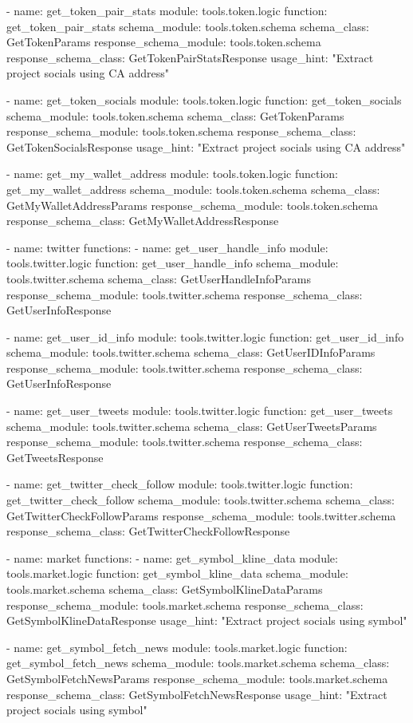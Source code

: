       - name: get_token_pair_stats
        module: tools.token.logic
        function: get_token_pair_stats
        schema_module: tools.token.schema
        schema_class: GetTokenParams
        response_schema_module: tools.token.schema
        response_schema_class: GetTokenPairStatsResponse
        usage_hint: "Extract project socials using CA address"

      - name: get_token_socials
        module: tools.token.logic
        function: get_token_socials
        schema_module: tools.token.schema
        schema_class: GetTokenParams
        response_schema_module: tools.token.schema
        response_schema_class: GetTokenSocialsResponse
        usage_hint: "Extract project socials using CA address"

      - name: get_my_wallet_address
        module: tools.token.logic
        function: get_my_wallet_address
        schema_module: tools.token.schema
        schema_class: GetMyWalletAddressParams
        response_schema_module: tools.token.schema
        response_schema_class: GetMyWalletAddressResponse

  - name: twitter
    functions:
      - name: get_user_handle_info
        module: tools.twitter.logic
        function: get_user_handle_info
        schema_module: tools.twitter.schema
        schema_class: GetUserHandleInfoParams
        response_schema_module: tools.twitter.schema
        response_schema_class: GetUserInfoResponse

      - name: get_user_id_info
        module: tools.twitter.logic
        function: get_user_id_info
        schema_module: tools.twitter.schema
        schema_class: GetUserIDInfoParams
        response_schema_module: tools.twitter.schema
        response_schema_class: GetUserInfoResponse

      - name: get_user_tweets
        module: tools.twitter.logic
        function: get_user_tweets
        schema_module: tools.twitter.schema
        schema_class: GetUserTweetsParams
        response_schema_module: tools.twitter.schema
        response_schema_class: GetTweetsResponse

      - name: get_twitter_check_follow
        module: tools.twitter.logic
        function: get_twitter_check_follow
        schema_module: tools.twitter.schema
        schema_class: GetTwitterCheckFollowParams
        response_schema_module: tools.twitter.schema
        response_schema_class: GetTwitterCheckFollowResponse

  - name: market
    functions:
      - name: get_symbol_kline_data
        module: tools.market.logic
        function: get_symbol_kline_data
        schema_module: tools.market.schema
        schema_class: GetSymbolKlineDataParams
        response_schema_module: tools.market.schema
        response_schema_class: GetSymbolKlineDataResponse
        usage_hint: "Extract project socials using symbol"

      - name: get_symbol_fetch_news
        module: tools.market.logic
        function: get_symbol_fetch_news
        schema_module: tools.market.schema
        schema_class: GetSymbolFetchNewsParams
        response_schema_module: tools.market.schema
        response_schema_class: GetSymbolFetchNewsResponse
        usage_hint: "Extract project socials using symbol"
